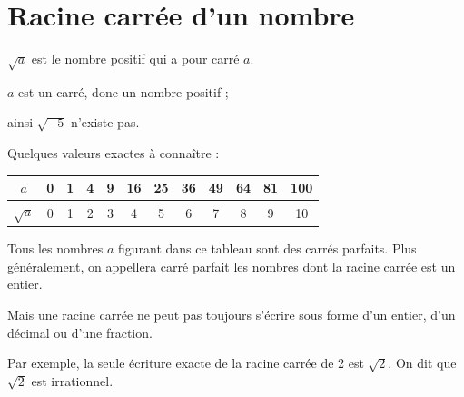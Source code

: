 \section{Racine carrée d'un nombre}

\begin{defi}{}{}
$\sqrt{a}$ est le nombre positif qui a pour carré $a$.
\end{defi}

\medskip
\noindent $a$ est un carré, donc un nombre positif ; 

\noindent ainsi $\sqrt{-5}$ n'existe pas.
\medskip

\noindent Quelques valeurs exactes à connaître :

\vspace{-15mm}
\begin{flushright}
\renewcommand{\arraystretch}{1.5}
\begin{tabular}{|c|c|c|c|c|c|c|c|c|c|c|c|}\hline
$a$&0&1&4&9&16&25&36&49&64&81&100\\\hline
$\sqrt{a}$&0&1&2&3&4&5&6&7&8&9&10\\\hline
\end{tabular}
\end{flushright}

\vspace{-6mm}
\begin{rem}{}{}
Tous les nombres $a$ figurant dans ce tableau sont des carrés parfaits. Plus généralement, on appellera carré parfait les nombres dont la racine carrée est un entier.

\medskip
\noindent Mais une racine carrée ne peut pas toujours s'écrire sous forme d'un entier, d'un décimal ou d'une fraction.

\noindent Par exemple, la seule écriture exacte de la racine carrée de 2 est $\sqrt{2}$. On dit que $\sqrt{2}$ est irrationnel.
\end{rem}

